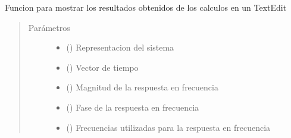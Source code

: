 \documentclass[letterpaper,10pt,spanish]{sphinxmanual}
\begin{document}
\begin{fulllineitems}
\label{\detokenize{codigos/rutinas_analisis:rutinas_analisis.rutina_system_info}}
Funcion para mostrar los resultados obtenidos de los calculos en un TextEdit
\begin{quote}\begin{description}
\item[{Parámetros}] \leavevmode\begin{itemize}
\item {} 
 () \textendash{} Representacion del sistema

\item {} 
 () \textendash{} Vector de tiempo

\item {} 
 () \textendash{} Magnitud de la respuesta en frecuencia

\item {} 
 () \textendash{} Fase de la respuesta en frecuencia

\item {} 
 () \textendash{} Frecuencias utilizadas para la respuesta en frecuencia

\end{itemize}

\end{description}\end{quote}

\end{fulllineitems}

\end{document}
